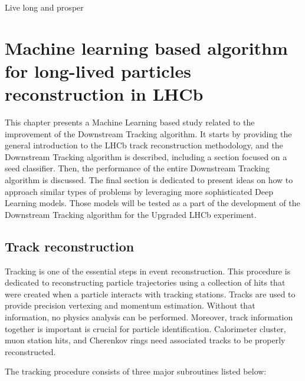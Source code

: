 \begin{savequote}[75mm] 
Live long and prosper
\end{savequote}

\chapter{Machine learning based algorithm for long-lived particles reconstruction in LHCb}
\label{chapter:PLLT}

This chapter presents a Machine Learning based study related to the improvement of the Downstream Tracking algorithm. It starts by providing the general introduction to the LHCb track reconstruction methodology, and the Downstream Tracking algorithm is described, including a section focused on a seed classifier. Then, the performance of the entire Downstream Tracking algorithm is discussed. The final section is dedicated to present ideas on how to approach similar types of problems by leveraging more sophisticated Deep Learning models. Those models will be tested as a part of the development of the Downstream Tracking algorithm for the Upgraded LHCb experiment.   

\section{Track reconstruction}
Tracking is one of the essential steps in event reconstruction. This procedure is dedicated to reconstructing particle trajectories using a collection of hits that were created when a particle interacts with tracking stations. Tracks are used to provide precision vertexing and momentum estimation. Without that information, no physics analysis can be performed. Moreover, track information together is important is crucial for particle identification. Calorimeter cluster, muon station hits, and Cherenkov rings need associated tracks to be properly reconstructed.

The tracking procedure consists of three major subroutines listed below: 

